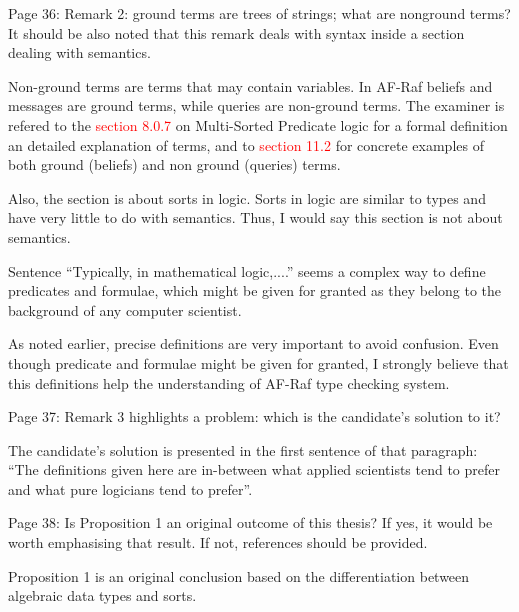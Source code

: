 \documentclass{article}
\newcommand*\R[1]{\textcolor{red}{#1}} %
\newenvironment{them}{\noindent\begingroup\color{blue}}{\endgroup\par}
\begin{document}
\begin{them}

Page 36:
Remark 2: ground terms are trees of strings; what are nonground terms? It
should be also noted that this remark deals with syntax inside a section
dealing with semantics.

\end{them}
Non-ground terms are terms that may contain variables. In AF-Raf beliefs and
messages are ground terms, while queries are non-ground terms. The examiner is
refered to the \R{section 8.0.7} on Multi-Sorted Predicate logic for a formal
definition an detailed explanation of terms, and to \R{section 11.2} for
concrete examples of both ground (beliefs) and non ground (queries) terms.

Also, the section is about sorts in logic. Sorts in logic are similar to types
and have very little to do with semantics. Thus, I would say this section is
not about semantics.

\begin{them}

Sentence “Typically, in mathematical logic,....” seems a complex way to define
predicates and formulae, which might be given for granted as they belong to the
background of any computer scientist.

\end{them}
As noted earlier, precise definitions are very important to avoid confusion.
Even though predicate and formulae might be given for granted, I strongly
believe that this definitions help the understanding of AF-Raf type checking
system.

\begin{them}

Page 37:
Remark 3 highlights a problem: which is the candidate's solution to it?

\end{them}

The candidate's solution is presented in the first sentence of that paragraph:
``The definitions given here are in-between what applied scientists tend to
prefer and what pure logicians tend to prefer''.

\begin{them}

Page 38:
Is Proposition 1 an original outcome of this thesis? If yes, it would be worth
emphasising that result. If not, references should be provided.

\end{them}
Proposition 1 is an original conclusion based on the differentiation between
algebraic data types and sorts. 
\end{document}
